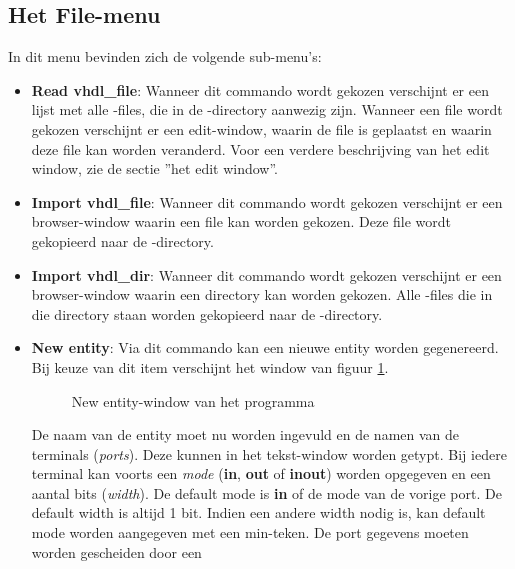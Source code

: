 \subsection{Het File-menu}
In dit menu bevinden zich de volgende sub-menu's:
\begin{itemize}
\item {\bf Read vhdl\_file}: Wanneer dit commando wordt gekozen verschijnt
                       er een lijst met alle -files, die in de -directory
                       aanwezig zijn. Wanneer een file wordt gekozen
                       verschijnt er een edit-window, waarin de file is
                       geplaatst en waarin deze file kan worden veranderd.
                       Voor een verdere beschrijving van het  edit window,
                       zie de sectie ''het  edit window''.
\item {\bf Import vhdl\_file}: Wanneer dit commando wordt gekozen verschijnt
               er een browser-window waarin een file kan worden gekozen.
               Deze file wordt gekopieerd naar de -directory.
\item {\bf Import vhdl\_dir}: Wanneer dit commando wordt gekozen verschijnt
               er een browser-window waarin een directory kan worden gekozen.
               Alle -files die in die directory staan
               worden gekopieerd naar de -directory.
\item {\bf New entity}: Via dit commando kan een nieuwe entity worden
                         gegenereerd.
               Bij keuze van dit item verschijnt het window van
               figuur \ref{newcell-window}.
               \begin{figure}[htb]
               \centerline{}
               \caption{New entity-window van het programma }
               \label{newcell-window}
               \end{figure}
               De naam van de entity moet nu worden ingevuld en de
               namen van de terminals ({\it ports}).
               Deze kunnen in het tekst-window worden getypt.
               Bij iedere terminal kan voorts
	       een {\it mode} ({\bf in}, {\bf out} of {\bf inout})
	       worden opgegeven en een aantal bits ({\it width}).
	       De default mode is {\bf in} of de mode van de vorige port.
	       De default width is altijd 1 bit.
	       Indien een andere width nodig is, kan default mode worden
	       aangegeven met een min-teken.
               De port gegevens moeten worden gescheiden door een 

\end{itemize}
